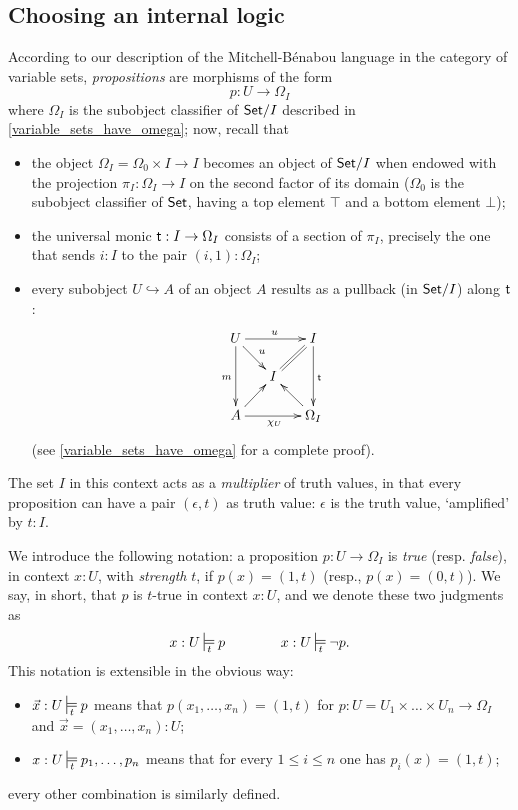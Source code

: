\subsection{Choosing an internal logic}
According to our description of the Mitchell-Bénabou language in the category of variable sets, \emph{propositions} are morphisms of the form
\[p : U \to \Omega_I\]
where $\Omega_I$ is the subobject classifier of $\mathsf{Set}/I$ described in \autoref{variable_sets_have_omega}; now, recall that
\begin{itemize}
	\item the object $\Omega_I = \Omega_0\times I \to I$ becomes an object of $\mathsf{Set}/I$ when endowed with the projection $\pi_I : \Omega_I \to I$ on the second factor of its domain ($\Omega_0$ is the subobject classifier of $\mathsf{Set}$, having a top element $\top$ and a bottom element $\bot$);
	\item the universal monic $\textsf{t} : I \to \Omega_I$ consists of a section of $\pi_I$, precisely the one that sends $i : I$ to the pair $(i,1) : \Omega_I$;
	\item every subobject $U \hookrightarrow A$ of an object $A$ results as a pullback (in $\mathsf{Set}/I$) along $\textsf{t}$:
	      \[\xymatrix@R=5mm@C=5mm{
		      U\ar[dr]^u\ar[rr]^u\ar[dd]_m&& I\ar[dd]^{\tr} \ar@{=}[dl]\\
		      &I& \\
		      A \ar[ur]\ar[rr]_{\chi_U}&& \ar[ul]\Omega_I
		      }\]
	      (see \autoref{variable_sets_have_omega} for a complete proof).
\end{itemize}
The set $I$ in this context acts as a \emph{multiplier} of truth values, in that every proposition can have a pair $(\epsilon, t)$ as truth value: $\epsilon$ is the truth value, `amplified' by $t : I$.
\begin{notation}
We introduce the following notation: a proposition $p : U \to \Omega_I$ is \emph{true} (resp. \emph{false}), in context $x :U$, with \emph{strength} $t$, if $p(x) =(1,t)$ (resp., $p(x)=(0,t)$). We say, in short, that $p$ is $t$-true in context $x:U$, and we denote these two judgments as
\[x:U\entails{t} p \qquad\qquad x:U\entails{t} \lnot p.\]
This notation is extensible in the obvious way:
\begin{itemize}
	\item $\vec x : U \entails{t} p$ means that $p(x_1,\dots,x_n) = (1,t)$ for $p : U= U_1\times\dots\times U_n\to \Omega_I$ and $\vec x = (x_1,\dots,x_n) : U$;
	\item $x : U \entails{t} p_1,\dots, p_n$ means that for every $1\le i \le n$ one has $p_i(x)=(1,t)$;
\end{itemize}
every other combination is similarly defined.
\end{notation}
